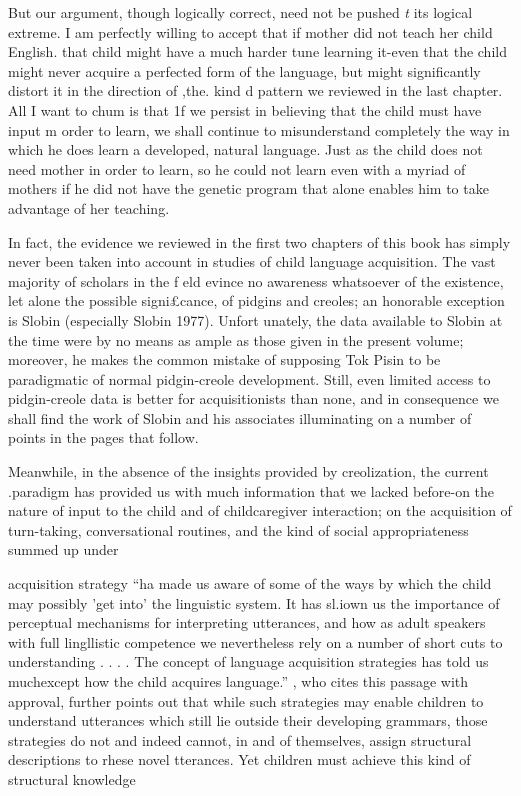 But our argument, though logically correct, need not be pushed \textit{t} its logical extreme. I am perfectly willing to accept that if mother did not teach her child English. that child might have a much harder tune learning it-even that the child might never acquire a perfected form of the language, but might significantly distort it in the direction of ,the. kind d pattern we reviewed in the last chapter. All I want to chum is that 1f we persist in believing that the child must have input m order to learn, we shall continue to misunderstand completely the way in which he does learn a developed, natural language. Just as
the child does not need mother in order to learn, so he could not learn even with a myriad of mothers if he did not have the genetic program that alone enables him to take advantage of her teaching.

In fact, the evidence we reviewed in the first two chapters of this book has simply never been taken into account in studies of child language acquisition. The vast majority of scholars in the f eld evince no awareness whatsoever of the existence, let alone the possible signi£cance, of pidgins and creoles; an honorable exception is Slobin (especially Slobin 1977). Unfort unately, the data available to Slobin at the time were by no means as ample as those given in the present volume; moreover, he makes the common mistake of supposing Tok Pisin to be paradigmatic of normal pidgin-creole development. Still, even limited access to pidgin-creole data is better for acquisitionists than none, and in consequence we shall find the work of Slobin and his associates illuminating on a number of points in the pages that
follow.

Meanwhile, in the absence of the insights provided by creolization, the current .paradigm has provided us with much information that we lacked before{}-on the nature of input to the child and of child\-caregiver interaction; on the acquisition of turn-taking, conversational routines, and the kind of social appropriateness summed up under


{\textquotedbl}acquisition strategy{\textquotedbl} ``ha made us aware of some of the ways by which the child may possibly 'get into' the linguistic system. It has sl.iown us the importance of perceptual mechanisms for interpreting utterances, and how as adult speakers with full lingllistic competence we nevertheless rely on a number of short cuts to understanding . . . . The concept of language acquisition strategies has told us much\-except how the child acquires language.'' \citet{Bowerman1979} , who cites this passage with approval, further points out that while such strategies may enable children to understand utterances which still lie outside their developing grammars, those strategies do not and indeed cannot, in and of themselves, assign structural descriptions to rhese novel tterances. Yet children must achieve this kind of structural knowledge


